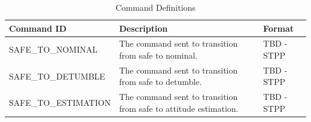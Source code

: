 \documentclass{article}
\begin{document}
        \begin{table}[H]
            \caption{Command Definitions}
            \vspace{4pt}
            \centering
            \renewcommand{\arraystretch}{1.4}
            \begin{tabular}{|l|p{8cm}|p{5cm}|}
                \hline
                \textbf{Command ID} & \textbf{Description} & \textbf{Format} \\ \hline
                SAFE\_TO\_NOMINAL    & The command sent to transition from safe
                                       to nominal.
                                     & TBD - STPP \\ \hline
                SAFE\_TO\_DETUMBLE   & The command sent to transition from safe
                                       to detumble.
                                     & TBD - STPP \\ \hline
                SAFE\_TO\_ESTIMATION & The command sent to transition from safe
                                       to attitude estimation. 
                                     & TBD - STPP \\ \hline
            \end{tabular}
        \end{table}
\end{document}
